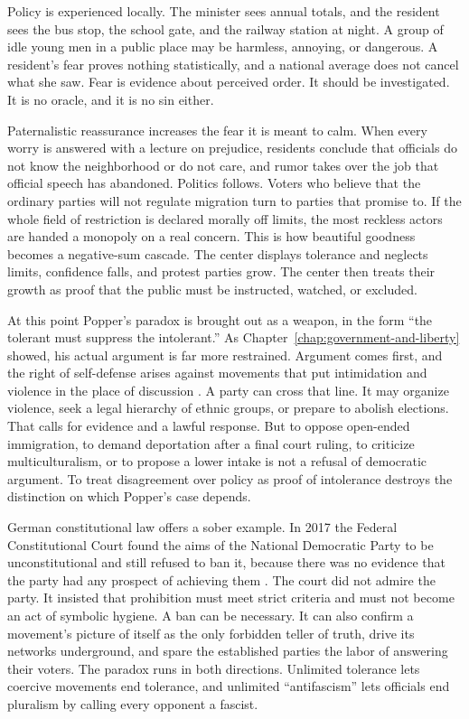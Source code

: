 \documentclass[12pt,a4paper]{book}
\begin{document}
Policy is experienced locally. The minister sees annual totals, and the resident sees the bus stop, the school gate, and the railway station at night. A group of idle young men in a public place may be harmless, annoying, or dangerous. A resident's fear proves nothing statistically, and a national average does not cancel what she saw. Fear is evidence about perceived order. It should be investigated. It is no oracle, and it is no sin either.

Paternalistic reassurance increases the fear it is meant to calm. When every worry is answered with a lecture on prejudice, residents conclude that officials do not know the neighborhood or do not care, and rumor takes over the job that official speech has abandoned. Politics follows. Voters who believe that the ordinary parties will not regulate migration turn to parties that promise to. If the whole field of restriction is declared morally off limits, the most reckless actors are handed a monopoly on a real concern. This is how beautiful goodness becomes a negative-sum cascade. The center displays tolerance and neglects limits, confidence falls, and protest parties grow. The center then treats their growth as proof that the public must be instructed, watched, or excluded.

At this point Popper's paradox is brought out as a weapon, in the form ``the tolerant must suppress the intolerant.'' As Chapter~\ref{chap:government-and-liberty} showed, his actual argument is far more restrained. Argument comes first, and the right of self-defense arises against movements that put intimidation and violence in the place of discussion \cite{Popper-TOSAIE}. A party can cross that line. It may organize violence, seek a legal hierarchy of ethnic groups, or prepare to abolish elections. That calls for evidence and a lawful response. But to oppose open-ended immigration, to demand deportation after a final court ruling, to criticize multiculturalism, or to propose a lower intake is not a refusal of democratic argument. To treat disagreement over policy as proof of intolerance destroys the distinction on which Popper's case depends.

German constitutional law offers a sober example. In 2017 the Federal Constitutional Court found the aims of the National Democratic Party to be unconstitutional and still refused to ban it, because there was no evidence that the party had any prospect of achieving them \cite{BVerfGNPD2017}. The court did not admire the party. It insisted that prohibition must meet strict criteria and must not become an act of symbolic hygiene. A ban can be necessary. It can also confirm a movement's picture of itself as the only forbidden teller of truth, drive its networks underground, and spare the established parties the labor of answering their voters. The paradox runs in both directions. Unlimited tolerance lets coercive movements end tolerance, and unlimited ``antifascism'' lets officials end pluralism by calling every opponent a fascist.
\end{document}
